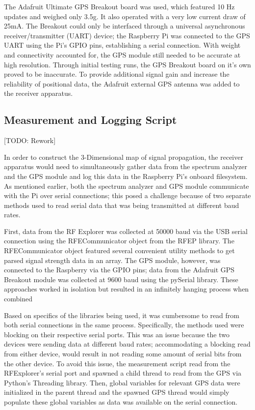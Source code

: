 \documentclass[pageno]{jpaper}
\begin{document}
The Adafruit Ultimate GPS Breakout board was used, which featured 10 Hz updates and weighed only 3.5g. It also operated with a very low current draw of 25mA. The Breakout could only be interfaced through a universal asynchronous receiver/transmitter (UART) device; the Raspberry Pi was connected to the GPS UART using the Pi's GPIO pins, establishing a serial connection. With weight and connectivity accounted for, the GPS module still needed to be accurate at high resolution. Through initial testing runs, the GPS Breakout board on it's own proved to be inaccurate. To provide additional signal gain and increase the reliability of positional data, the Adafruit external GPS antenna was added to the receiver apparatus.  

\subsection{Measurement and Logging Script}
[TODO: Rework]

In order to construct the 3-Dimensional map of signal propagation, the receiver apparatus would need to simultaneously gather data from the spectrum analyzer and the GPS module and log this data in the Raspberry Pi's onboard filesystem. As mentioned earlier, both the spectrum analyzer and GPS module communicate with the Pi over serial connections; this posed a challenge because of two separate methods used to read serial data that was being transmitted at different baud rates.

First, data from the RF Explorer was collected at 50000 baud via the USB serial connection using the RFECommunicator object from the RFEP library. The RFECommunicator object featured several convenient utility methods to get parsed signal strength data in an array. The GPS module, however, was connected to the Raspberry via the GPIO pins; data from the Adafruit GPS Breakout module was collected at 9600 baud using the pySerial library. These approaches worked in isolation but resulted in an infinitely hanging process when combined

Based on specifics of the libraries being used, it was cumbersome to read from both serial connections in the same process. Specifically, the methods used were blocking on their respective serial ports. This was an issue because the two devices were sending data at different baud rates; accommodating a blocking read from either device, would result in not reading some amount of serial bits from the other device. To avoid this issue, the measurement script read from the RFExplorer's serial port and spawned a child thread to read from the GPS via Python's Threading library. Then, global variables for relevant GPS data were initialized in the parent thread and the spawned GPS thread would simply populate these global variables as data was available on the serial connection.
\end{document}
